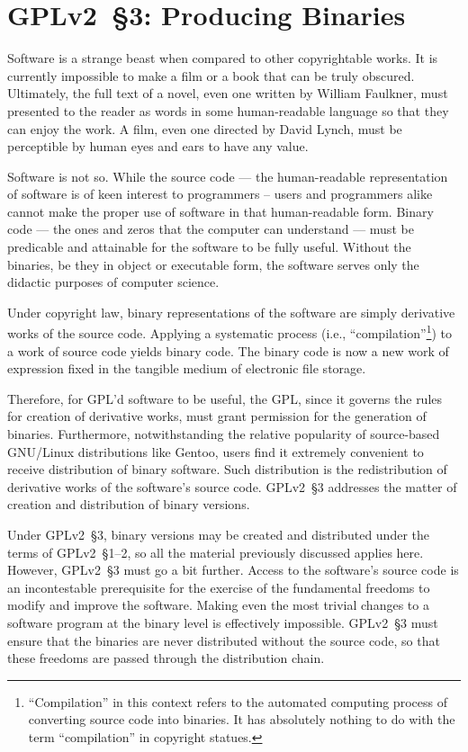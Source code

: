 \section{GPLv2~\S3: Producing Binaries}
\label{GPL-Section-3}

Software is a strange beast when compared to other copyrightable works.
It is currently impossible to make a film or a book that can be truly
obscured.  Ultimately, the full text of a novel, even one written by
William Faulkner, must presented to the reader as words in some
human-readable language so that they can enjoy the work.  A film, even one
directed by David Lynch, must be perceptible by human eyes and ears to
have any value.

Software is not so.  While the source code --- the human-readable
representation of software is of keen interest to programmers -- users and
programmers alike cannot make the proper use of software in that
human-readable form.  Binary code --- the ones and zeros that the computer
can understand --- must be predicable and attainable for the software to
be fully useful.  Without the binaries, be they in object or executable
form, the software serves only the didactic purposes of computer science.

Under copyright law, binary representations of the software are simply
derivative works of the source code.  Applying a systematic process (i.e.,
``compilation''\footnote{``Compilation'' in this context refers to the
  automated computing process of converting source code into binaries.  It
  has absolutely nothing to do with the term ``compilation'' in copyright statues.}) to a work of source code yields binary code. The binary
code is now a new work of expression fixed in the tangible medium of
electronic file storage.

Therefore, for GPL'd software to be useful, the GPL, since it governs the
rules for creation of derivative works, must grant permission for the
generation of binaries.  Furthermore, notwithstanding the relative
popularity of source-based GNU/Linux distributions like Gentoo, users find
it extremely convenient to receive distribution of binary software.  Such
distribution is the redistribution of derivative works of the software's
source code.  GPLv2~\S3 addresses the matter of creation and distribution of
binary versions.

Under GPLv2~\S3, binary versions may be created and distributed under the
terms of GPLv2~\S1--2, so all the material previously discussed applies
here.  However, GPLv2~\S3 must go a bit further.  Access to the software's
source code is an incontestable prerequisite for the exercise of the
fundamental freedoms to modify and improve the software.  Making even
the most trivial changes to a software program at the binary level is
effectively impossible.  GPLv2~\S3 must ensure that the binaries are never
distributed without the source code, so that these freedoms are passed
through the distribution chain.

